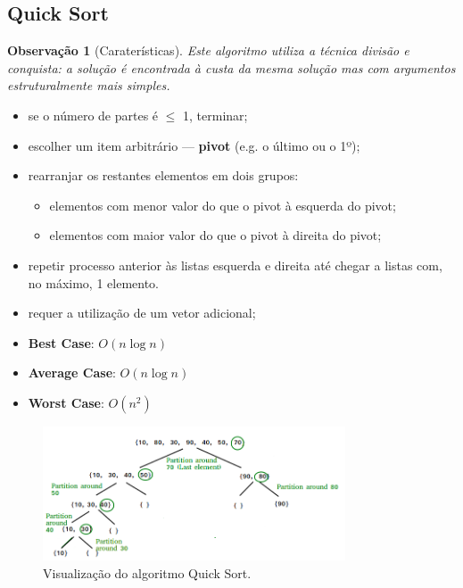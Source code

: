 \documentclass[a4paper, 12pt]{article}
\newtheorem{remark}{Observação}
\begin{document}
\subsection{Quick Sort}
\begin{remark}[Caraterísticas]
    Este algoritmo utiliza a técnica divisão e conquista: a solução é encontrada à custa da mesma solução mas com argumentos estruturalmente mais simples.\end{remark}
    \begin{itemize}[Funcionamento]
        \item se o número de partes é $\leq$ 1, terminar;
        \item escolher um item arbitrário — \textbf{pivot} (e.g. o último ou o 1º);
        \item rearranjar os restantes elementos em dois grupos:
        \begin{itemize}
            \item elementos com menor valor do que o pivot à esquerda do pivot;
            \item elementos com maior valor do que o pivot à direita do pivot;
        \end{itemize}
        \item repetir processo anterior às listas esquerda e direita até chegar a listas com, no máximo, 1 elemento.
    \end{itemize}
    \begin{itemize}
        \item requer a utilização de um vetor adicional;
        \item \textbf{Best Case}: $O(n\log n)$
        \item \textbf{Average Case}: $O(n\log n)$
        \item \textbf{Worst Case}: $O(n^2)$
    \end{itemize}
\begin{center}
    \begin{figure}[h]
        \centering
        \includegraphics[width=0.8\textwidth]{fig/ao/qs.png}
        \caption{Visualização do algoritmo Quick Sort.}
    \end{figure}
\end{center}
\end{document}

